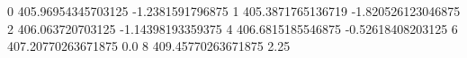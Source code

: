 0 405.96954345703125 -1.2381591796875
1 405.3871765136719 -1.820526123046875
2 406.063720703125 -1.14398193359375
4 406.6815185546875 -0.52618408203125
6 407.20770263671875 0.0
8 409.45770263671875 2.25
